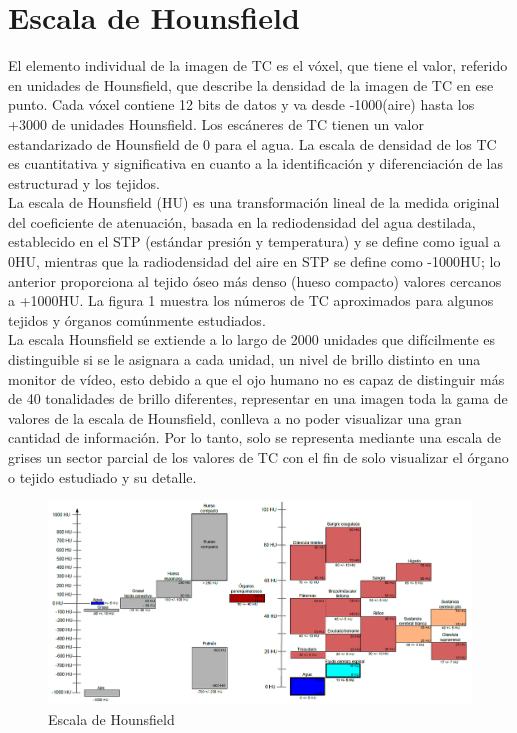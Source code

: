 \documentclass[12pt]{report}
\begin{document}
\section{Escala de Hounsfield}
El elemento individual de la imagen de TC es el vóxel, que tiene el valor, referido en unidades de Hounsfield, que describe la densidad de la imagen de TC en ese punto. Cada vóxel contiene 12 bits de datos y va desde -1000(aire) hasta los +3000 de unidades Hounsfield. Los escáneres de TC tienen un valor estandarizado de Hounsfield de 0 para el agua. La escala de densidad de los TC es cuantitativa y significativa en cuanto a la identificación y diferenciación de las estructurad y los tejidos.\\
La escala de Hounsfield (HU) es una transformación lineal de la medida original del coeficiente de atenuación, basada en la rediodensidad del agua destilada, establecido en el STP (estándar presión y temperatura) y se define como igual a 0HU, mientras que la radiodensidad del aire en STP se define como -1000HU; lo anterior proporciona al tejido óseo más denso (hueso compacto) valores cercanos a +1000HU. La figura 1 muestra los números de TC aproximados para algunos tejidos y órganos comúnmente estudiados.\\
La escala Hounsfield se extiende a lo largo de 2000 unidades que difícilmente es distinguible si se le asignara a cada unidad, un nivel de brillo distinto en una monitor de vídeo, esto debido a que el ojo humano no es capaz de distinguir más de 40 tonalidades de brillo diferentes, representar en una imagen toda la gama de valores de la escala de Hounsfield, conlleva a no poder visualizar una gran cantidad de información. Por lo tanto, solo se representa mediante una escala de grises un sector parcial de los valores de TC con el fin de solo visualizar el órgano o tejido estudiado y su detalle.\\
\begin{figure}[H]
\centering
\includegraphics[width = 13 cm, height = 10 cm]{escala}
\caption{Escala de Hounsfield}
\end{figure}
\end{document}
